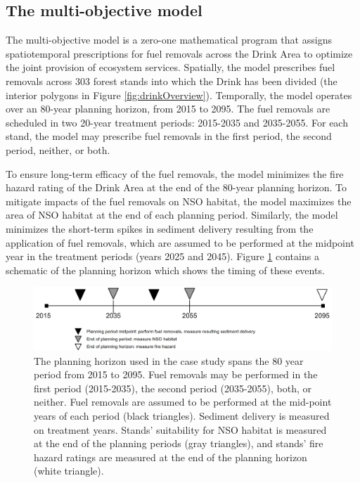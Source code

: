 \subsection{The multi-objective model}
The multi-objective model is a zero-one mathematical program that assigns spatiotemporal prescriptions for fuel removals across the Drink Area to optimize the joint provision of ecosystem services. Spatially, the model prescribes fuel removals across 303 forest stands into which the Drink has been divided (the interior polygons in Figure \ref{fig:drinkOverview}). Temporally, the model operates over an 80-year planning horizon, from 2015 to 2095. The fuel removals are scheduled in two 20-year treatment periods: 2015-2035 and 2035-2055. For each stand, the model may prescribe fuel removals in the first period, the second period, neither, or both.

To ensure long-term efficacy of the fuel removals, the model minimizes the fire hazard rating of the Drink Area at the end of the 80-year planning horizon. To mitigate impacts of the fuel removals on NSO habitat, the model maximizes the area of NSO habitat at the end of each planning period. Similarly, the model minimizes the short-term spikes in sediment delivery resulting from the application of fuel removals, which are assumed to be performed at the midpoint year in the treatment periods (years 2025 and 2045). Figure \ref{fig:drinkPlanningHorizon} contains a schematic of the planning horizon which shows the timing of these events.

\begin{figure}
\centering
\includegraphics[width=.9\textwidth]{../images/Drink_PlanningHorizon_Sketch}
\caption[Planning horizon for the case study]{The planning horizon used in the case study spans the 80 year period from 2015 to 2095. Fuel removals may be performed in the first period (2015-2035), the second period (2035-2055), both, or neither. Fuel removals are assumed to be performed at the mid-point years of each period (black triangles). Sediment delivery is measured on treatment years. Stands' suitability for NSO habitat is measured at the end of the planning periods (gray triangles), and stands' fire hazard ratings are measured at the end of the planning horizon (white triangle).}
\label{fig:drinkPlanningHorizon}
\end{figure}

